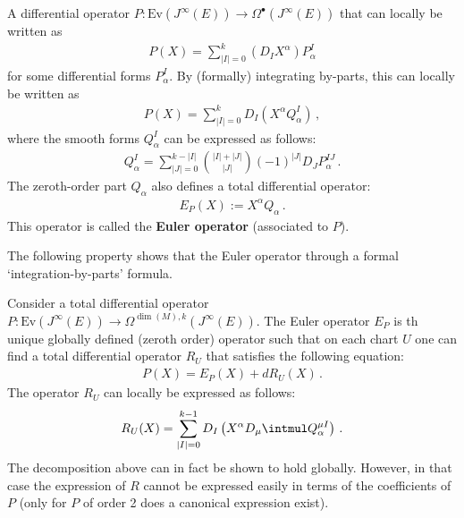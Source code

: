     \begin{property}
        A differential operator $P:\mathrm{Ev}(J^\infty(E))\rightarrow\Omega^\bullet(J^\infty(E))$ that can locally be written as
        \begin{gather}
            P(X) = \sum_{|I|=0}^k\left(D_IX^\alpha\right)P^I_\alpha
        \end{gather}
        for some differential forms $P^I_\alpha$. By (formally) integrating by-parts, this can locally be written as
        \begin{gather}
            P(X) = \sum_{|I|=0}^kD_I\left(X^\alpha Q^I_\alpha\right)\,,
        \end{gather}
        where the smooth forms $Q^I_\alpha$ can be expressed as follows:
        \begin{gather}
            \label{var:Q_forms}
            Q^I_\alpha = \sum_{|J|=0}^{k-|I|}\binom{|I|+|J|}{|J|}(-1)^{|J|}D_JP^{IJ}_\alpha\,.
        \end{gather}
        The zeroth-order part $Q_\alpha$ also defines a total differential operator:
        \begin{gather}
            E_P(X) := X^\alpha Q_\alpha\,.
        \end{gather}
        This operator is called the \textbf{Euler operator} (associated to $P$).
    \end{property}
    The following property shows that the Euler operator through a formal `integration-by-parts' formula.
    \begin{property}\label{var:differential_operator_decomposition}
        Consider a total differential operator $P:\mathrm{Ev}(J^\infty(E))\rightarrow\Omega^{\dim(M),k}(J^\infty(E))$. The Euler operator $E_P$ is th unique globally defined (zeroth order) operator such that on each chart $U$ one can find a total differential operator $R_U$ that satisfies the following equation:
        \begin{gather}
            P(X) = E_P(X) + dR_U(X)\,.
        \end{gather}
        The operator $R_U$ can locally be expressed as follows:
        \begin{gather}
            R_U(X) = \sum_{|I|=0}^{k-1}D_I\left(X^\alpha D_\mu\intmul Q^{\mu I}_\alpha\right)\,.
        \end{gather}
        The decomposition above can in fact be shown to hold globally. However, in that case the expression of $R$ cannot be expressed easily in terms of the coefficients of $P$ (only for $P$ of order 2 does a canonical expression exist).
    \end{property}

